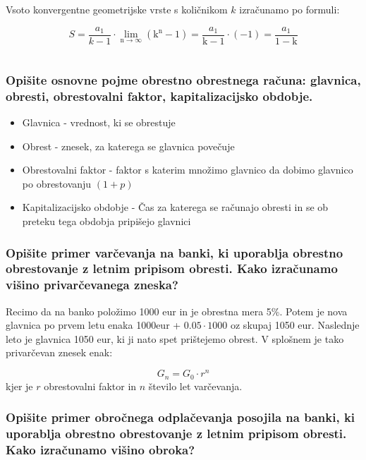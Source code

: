 \documentclass{article}
\begin{document}
Vsoto konvergentne geometrijske vrste s količnikom $k$ izračunamo po formuli:

$$
S=\frac{a_{1}}{k-1} \cdot \lim _{\mathrm{n} \rightarrow \infty}\left(\mathrm{k}^{\mathrm{n}}-1\right)=\frac{a_{1}}{\mathrm{k}-1} \cdot(-1)=\frac{a_{1}}{1-\mathrm{k}}
$$

\section{\texorpdfstring{}{Obrestni račun}}
\subsubsection*{Opišite osnovne pojme obrestno obrestnega računa: glavnica, obresti, obrestovalni faktor, kapitalizacijsko obdobje.}

\begin{itemize}
    \item Glavnica - vrednost, ki se obrestuje
    \item Obrest - znesek, za katerega se glavnica povečuje
    \item Obrestovalni faktor - faktor s katerim množimo glavnico da dobimo glavnico po obrestovanju $(1+p)$
    \item Kapitalizacijsko obdobje - Čas za katerega se računajo obresti in se ob preteku tega obdobja pripišejo glavnici
\end{itemize}

\subsubsection*{Opišite primer varčevanja na banki, ki uporablja obrestno obrestovanje z letnim pripisom obresti. Kako izračunamo višino privarčevanega zneska?}

Recimo da na banko položimo 1000 eur in je obrestna mera 5\%. Potem je nova glavnica po prvem letu enaka 1000eur + $0.05 \cdot 1000$ oz skupaj 1050 eur. Naslednje leto je glavnica 1050 eur, ki ji nato spet prištejemo obrest. V splošnem je tako privarčevan znesek enak:

$$
G_n = G_0 \cdot r^n
$$
kjer je $r$ obrestovalni faktor in $n$ število let varčevanja.

\subsubsection*{Opišite primer obročnega odplačevanja posojila na banki, ki uporablja obrestno obrestovanje z letnim pripisom obresti. Kako izračunamo višino obroka?}
\end{document}
